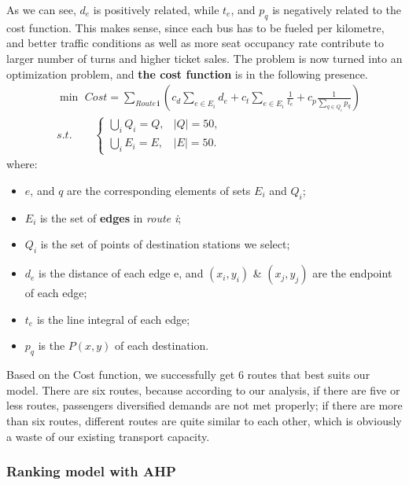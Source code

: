 \documentclass{mcmthesis}
\begin{document}
As we can see, $d_e$ is positively related, while $t_e$, and $p_q$ is negatively related to the cost function. This makes sense, since each bus has to be fueled per kilometre, and better traffic conditions as well as more seat occupancy rate contribute to larger number of turns and higher ticket sales.
The problem is now turned into an optimization problem, and \textbf{the cost function} is in the following presence.
\begin{equation}
\begin{aligned}	
    & \min\,\, Cost = \sum\limits_{Route\,\textbf{i}}(c_d \sum\limits_{e\in E_i} d_e + c_t \sum\limits_{e\in E_i} \frac{1}{t_e} + c_p \frac{1}{\sum\limits_{q\in Q_i} p_q})\\
    & s.t. \qquad
    \begin{cases}
    \bigcup\limits_{i}Q_i = Q, & |Q| = 50,\\
    \bigcup\limits_{i}E_i = E, & |E| = 50.
    \end{cases}
\end{aligned}
\end{equation}
where:
\begin{itemize}
    \item $e$, and $q$ are the corresponding elements of sets $E_i$ and $Q_i$;
    \item $E_i$ is the set of \textbf{edges} in \emph{route i};
    \item $Q_i$ is the set of points of destination stations we select;
    \item $d_e$ is the distance of each edge e, and $(x_i,y_i)$ \& $(x_j,y_j)$ are the endpoint of each edge;
    \item $t_e$ is the line integral of each edge;
    \item $p_q$ is the $P(x,y)$ of each destination.
\end{itemize}

Based on the Cost function, we successfully get 6 routes that best suits our model. There are six routes, because according to our analysis, if there are five or less routes, passengers diversified demands are not met properly; if there are more than six routes, different routes are quite similar to each other, which is obviously a waste of our existing transport capacity.

\subsubsection{Ranking model with AHP}
\end{document}
